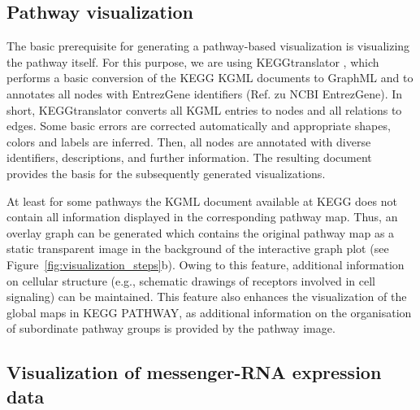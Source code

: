 \documentclass{bioinfo}
\begin{document}
\subsection{Pathway visualization}

The basic prerequisite for generating a pathway-based visualization is visualizing the pathway
itself. For this purpose, we are using KEGGtranslator \citep[see][]{Wrzodek2011}, which performs a
basic conversion of the KEGG KGML documents to GraphML and to annotates all nodes with EntrezGene
identifiers (Ref. zu NCBI EntrezGene). In short, KEGGtranslator converts all KGML entries to nodes
and all relations to edges. Some basic errors are corrected automatically and appropriate shapes,
colors and labels are inferred. Then, all nodes are annotated with diverse identifiers,
descriptions, and further information. The resulting document provides the basis for the
subsequently generated visualizations.

%

At least for some pathways the KGML document available at KEGG does not contain all information
displayed in the corresponding pathway map. Thus, an overlay graph can be generated which contains the
original pathway map as a static transparent image in the background of the interactive graph plot
(see Figure~\ref{fig:visualization_steps}b). Owing to this feature, additional information on
cellular structure (e.g., schematic drawings of receptors involved in cell signaling) can be maintained.
This feature also enhances the visualization of the global maps in KEGG PATHWAY, as additional
information on the organisation of subordinate pathway groups is provided by the pathway image.

\subsection{Visualization of messenger-RNA expression data}
\end{document}
